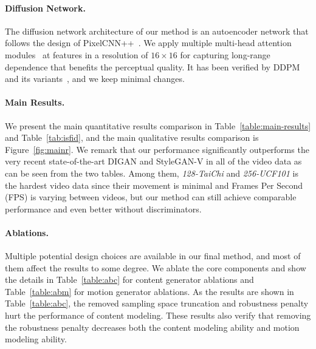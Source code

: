 \documentclass[letterpaper]{article}
\begin{document}
\paragraph{Diffusion Network.}
The diffusion network architecture of our method is an autoencoder network that follows the design of PixelCNN++~\cite{salimans2017pixelcnn++}.
We apply multiple multi-head attention modules~\cite{vaswani2017attention} at features in a resolution of $16\times 16$ for capturing long-range dependence that benefits the perceptual quality.
It has been verified by DDPM~\cite{ho2020denoising} and its variants~\cite{dhariwal2021diffusion, nichol2021improved}, and we keep minimal changes.

\paragraph{Main Results.}
We present the main quantitative results comparison in Table~\ref{table:main-results} and Table~\ref{tab:isfid}, and the main qualitative results comparison is Figure~\ref{fig:mainr}. We remark that our performance significantly outperforms the very recent state-of-the-art DIGAN and StyleGAN-V in all of the video data as can be seen from the two tables. Among them, \emph{128-TaiChi} and \emph{256-UCF101} is the hardest video data since their movement is minimal and Frames Per Second (FPS) is varying between videos, but our method can still achieve comparable performance and even better without discriminators. 


\paragraph{Ablations.}
Multiple potential design choices are available in our final method, and most of them affect the results to some degree.
We ablate the core components and show the details in Table~\ref{table:abc} for content generator ablations and Table~\ref{table:abm} for motion generator ablations.
As the results are shown in Table~\ref{table:abc}, the removed sampling space truncation and robustness penalty hurt the performance of content modeling.
These results also verify that removing the robustness penalty decreases both the content modeling ability and motion modeling ability.
\end{document}

